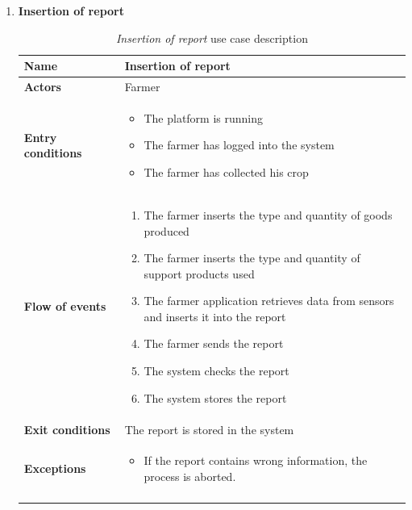 \documentclass[10pt]{article}
\begin{document}
\begin{enumerate}[label=\textbf{UC\arabic*}]
    \newpage
    \item \label{uc:uc4} \textbf{Insertion of report}
        \begin{longtable}{p{0.26\linewidth}p{0.75\linewidth}}
            \toprule
            \textbf{Name} & \textbf{Insertion of report} \\
            \midrule
            \textbf{Actors} & Farmer\\
            \midrule
            \textbf{Entry conditions} & 
            \begin{itemize}
                \item The platform is running
                \item The farmer has logged into the system
                \item The farmer has collected his crop
            \end{itemize}\\
            \midrule
            \textbf{Flow of events} & 
            \begin{enumerate}
                \item The farmer inserts the type and quantity of goods produced
                \item The farmer inserts the type and quantity of support products used
                \item The farmer application retrieves data from sensors and inserts it into the report
                \item The farmer sends the report
                \item The system checks the report
                \item The system stores the report
            \end{enumerate} \\
            \midrule
            \textbf{Exit conditions} & The report is stored in the system\\
            \midrule
            \textbf{Exceptions} & 
            \begin{itemize}
                \item If the report contains wrong information, the process is aborted.
            \end{itemize} \\
            \bottomrule
            \caption{\emph{Insertion of report} use case description}
        \end{longtable}
    \newpage
        \begin{figure}[ht!]
            \centering

\end{figure}
\end{enumerate}
\end{document}

